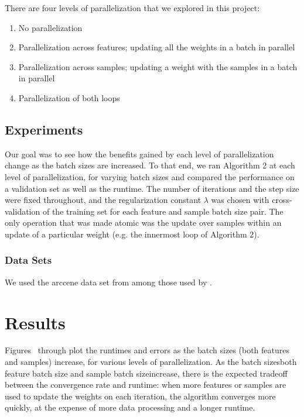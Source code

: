\documentclass{article}
\begin{document}
There are four levels of parallelization that we explored in this project:
\begin{enumerate}
\item
No parallelization
\item
Parallelization across features; updating all the weights in a batch in parallel
\item
Parallelization across samples; updating a weight with the samples in a batch in parallel
\item
Parallelization of both loops
\end{enumerate}
\subsection{Experiments}
Our goal was to see how the benefits gained by each level of parallelization change as the batch sizes are increased.  To that end, we ran Algorithm 2 at each level of parallelization, for varying batch sizes and compared the performance on a validation set as well as the runtime. The number of iterations and the step size were fixed throughout, and the regularization constant $\lambda$ was chosen with cross-validation of the training set for each feature and sample batch size pair. The only operation that was made atomic was the update over samples within an update of a particular weight (e.g. the innermost loop of Algorithm 2).
\subsubsection{Data Sets}
We used the arccene data set from among those used by \cite{shotgun2011}.

\section{Results}


Figures~\cite{fig:NAME1} through \cite{fig:NAMEn} plot the runtimes and errors as the batch sizes (both features and samples) increase, for various levels of parallelization. As the batch sizes\textemdash both feature batch size and sample batch size\textemdash increase, there is the expected tradeoff between the convergence rate and runtime: when more features or samples are used to update the weights on each iteration, the algorithm converges more quickly, at the expense of more data processing and a longer runtime.
\end{document}
